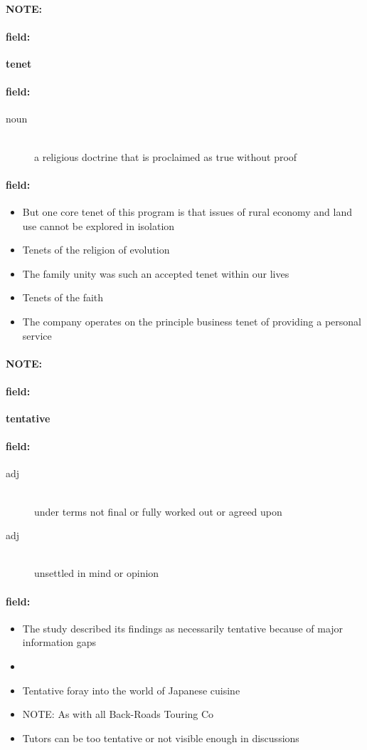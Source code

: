 \documentclass[12pt]{article}
\newenvironment{note}{\paragraph{NOTE:}}{}
\newenvironment{field}{\paragraph{field:}}{}
\begin{document}
\begin{note}
\begin{field}
\textbf{\large tenet}
\end{field}


\begin{field}
\begin{description}
\item[noun] \hfill \\ 
a religious doctrine that is proclaimed as true without proof

\end{description}
\end{field}

\begin{field}
\begin{itemize}
\item But one core tenet of this program is that issues of rural economy and land use cannot be explored in isolation
\item Tenets of the religion of evolution
\item The family unity was such an accepted tenet within our lives
\item Tenets of the faith
\item The company operates on the principle business tenet of providing a personal service 
\end{itemize}
\end{field}
\end{note}
\begin{note}
\begin{field}
\textbf{\large tentative}
\end{field}


\begin{field}
\begin{description}
\item[adj] \hfill \\ 
under terms not final or fully worked out or agreed upon

\item[adj] \hfill \\ 
unsettled in mind or opinion

\end{description}
\end{field}

\begin{field}
\begin{itemize}
\item The study described its findings as necessarily tentative because of major information gaps
\item 
\item Tentative foray into the world of Japanese cuisine
\item NOTE: As with all Back-Roads Touring Co
\item Tutors can be too tentative or not visible enough in discussions
\end{itemize}
\end{field}
\end{note}
\end{document}
